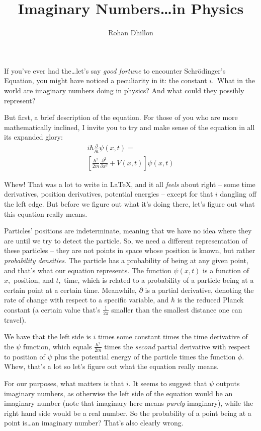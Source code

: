 \documentclass{article}
\title{Imaginary Numbers\dots in Physics}
\author{Rohan Dhillon}
\begin{document}
\maketitle
If you've ever had the\dots let's say \textit{good fortune} to encounter Schr\"odinger's Equation, you might have noticed a peculiarity in it: the constant $i$. What in the world are imaginary numbers doing in physics? And what could they possibly represent?

But first, a brief description of the equation. For those of you who are more mathematically inclined, I invite you to try and make sense of the equation in all its expanded glory:
\begin{multline*}
    i\hbar \frac{\partial}{\partial t} \psi (x,t)= \\
    \left[ \frac{\hbar^2}{2m}\frac{\partial^2}{\partial x^2}+V(x,t)\right] \psi (x,t)
\end{multline*}
    
Whew! That was a lot to write in \LaTeX, and it all \textit{feels} about right -- some time derivatives, position derivatives, potential energies -- except for that $i$ dangling off the left edge. But before we figure out what it's doing there, let's figure out what this equation really means. 

Particles' positions are indeterminate, meaning that we have no idea where they are until we try to detect the particle.
So, we need a different representation of these particles -- they are not points in space whose position is known, but rather \textit{probability densities}. 
The particle has a probability of being at any given point, and that's what our equation represents. The function $\psi(x,t)$ is a function of $x,$ position, and $t,$ time, which is related to a probability of a particle being at a certain point at a certain time. Meanwhile, $\partial$ is a partial derivative, denoting the rate of change with respect to a specific variable, and $\hbar$ is the reduced Planck constant (a certain value that's $\frac{1}{2\pi}$ smaller than the smallest distance one can travel).

We have that the left side is $i$ times some constant times the time derivative of the $\psi$ function, which equals $\frac{\hbar^2}{2m}$ times the \textit{second} partial derivative with respect to position of $\psi$ plus the potential energy of the particle times the function $\phi.$ Whew, that's a lot so let's figure out what the equation really means.

For our purposes, what matters is that $i.$ It seems to suggest that $\psi$ outputs imaginary numbers, as otherwise the left side of the equation would be an imaginary number (note that imaginary here means \textit{purely} imaginary), while the right hand side would be a real number. So the probability of a point being at a point is\dots an imaginary number? That's also clearly wrong. 
\end{document}
